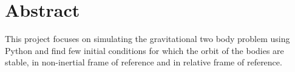 \newpage
\section{Abstract}

This project focuses on simulating the gravitational two body problem using Python and find few initial conditions for which the orbit of the bodies are stable, in non-inertial frame of reference and in relative frame of reference.

